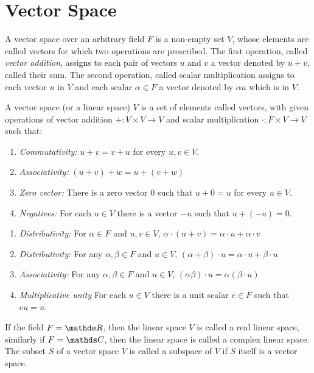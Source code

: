\documentclass[../main-sheet.tex]{subfiles}
\begin{document}
\section{Vector Space}
A vector space over an arbitrary field $ F $ is a non-empty set $ V $, whose elements are called vectors for which two operations are prescribed. The first operation, called \emph{vector addition}, assigns to each pair of vectors $ u $ and $ v $ a vector denoted by $ u+v $, called their sum. The second operation, called scalar multiplication assigns to each vector $ u $ in $ V $ and each scalar $ \alpha\in F $ a vector denoted by $ \alpha u $ which is in $ V $.
\begin{defn}
    A vector space (or a linear space) $ V $ is a set of elements called vectors, with given operations of vector addition $ +:V\times V\to V $ and scalar multiplication $ \cdot:F\times V\to V $ such that:
    \begin{enumerate}[label=A(\roman*)]
        \item \emph{Commutativity:} $ u+v=v+u $ for every $ u,v\in V $.
        \item \emph{Associativity:} $ (u+v)+w=u+(v+w) $
        \item \emph{Zero vector:} There is a zero vector $ 0 $ such that $ u+0=u $ for every $ u\in V $.
        \item \emph{Negatives:} For each $ u\in V $ there is a vector $ -u $ such that $ u+(-u)=0 $.
    \end{enumerate}
    \begin{enumerate}[label=M(\roman*)]
        \item \emph{Distributivity:} For $ \alpha\in F $ and $ u,v\in V $, $ \alpha\cdot(u+v)=\alpha\cdot u+\alpha\cdot v $
        \item \emph{Distributivity:} For any $ \alpha,\beta\in F $ and $ u\in V $, $ (\alpha+\beta)\cdot u=\alpha\cdot u+\beta\cdot u $
        \item \emph{Associativity:} For any $ \alpha,\beta\in F $ and $ u\in V $, $ (\alpha\beta)\cdot u=\alpha(\beta\cdot u) $
        \item \emph{Multiplicative unity} For each $ u\in V $ there is a unit scalar $ e\in F $ such that $ e u=u $.
    \end{enumerate}
    If the field $ F=\R $, then the linear space $ V $ is called a real linear space, similarly if $ F=\C $, then the linear space is called a complex linear space. The subset $ S $ of a vector space $ V $ is called a subspace of $ V $ if $ S $ itself is a vector space.
\end{defn}
\end{document}

